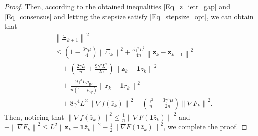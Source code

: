 \documentclass[10pt,a4paper]{amsart}
\begin{document}
\begin{proof}
Then, according to the obtained inequalities \eqref{Eq_z_ietr_gap} and \eqref{Eq_consensus} and letting the stepsize satisfy \eqref{Eq_stepsize_opt}, we can obtain that
\begin{equation*}
\begin{aligned}
&\left\| \varXi _{k+1} \right\| ^2
\\
&\leqslant \left( 1-\frac{3\gamma \mu}{4} \right) \left\| \varXi _k \right\| ^2+\frac{5\gamma ^2L^2}{4n}\left\| \mathbf{z}_k-\mathbf{z}_{k-1} \right\| ^2
\\
&\quad+\left( \frac{2\gamma L}{n}+\frac{9\gamma ^2L^2}{2n} \right) \left\| \mathbf{z}_k-\mathbf{1}\bar{z}_k \right\| ^2
\\
&\quad+\frac{9\gamma ^3L\rho _W}{n\left( 1-\rho _W \right)}\left\| \mathbf{r}_k-\mathbf{1}\bar{r}_k \right\| ^2
\\
&\quad+8\gamma ^4L^2\left\| \nabla f\left( \bar{z}_k \right) \right\| ^2-\left( \frac{\gamma ^2}{n}-\frac{3\gamma ^3\mu}{2n} \right) \left\| \nabla F_k \right\| ^2.
\end{aligned}
\end{equation*}
Then, noticing that $\left\| \nabla f\left( \bar{z}_k \right) \right\| ^2\leqslant \frac{1}{n}\left\| \nabla F\left( \mathbf{1}\bar{z}_k \right) \right\| ^2$ and
$-\left\| \nabla F_k \right\| ^2\leqslant L^2\left\| \mathbf{z}_k-\mathbf{1}\bar{z}_k \right\| ^2-\frac{1}{2}\left\| \nabla F\left( \mathbf{1}\bar{z}_k \right) \right\| ^2$, we complete the proof.
\end{proof}
\end{document}
